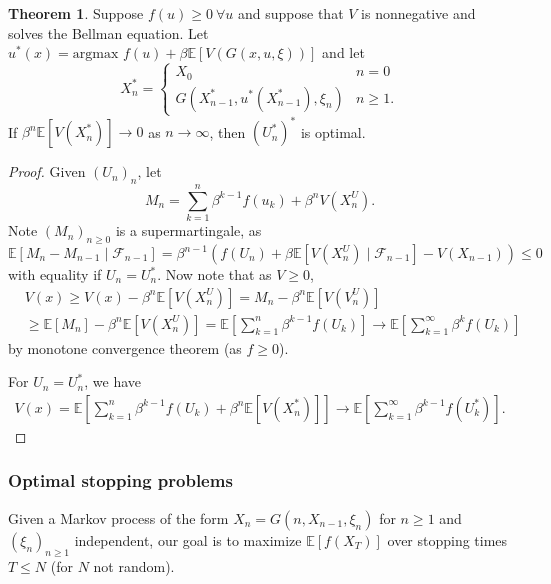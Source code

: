 \documentclass{article}
\theoremstyle{definition}
\newtheorem{theorem}{Theorem}[section]
\begin{document}
\begin{theorem}
    Suppose $f(u)\ge 0 ~\forall u$ and suppose that $V$ is nonnegative and solves the Bellman equation. Let $u^*(x) = \text{argmax }f(u) + \beta \mathbb{E}[V(G(x,u,\xi))]$ and let \[
    X_n^* = \begin{cases}
        X_0 &n=0\\
        G(X_{n-1}^*,u^*(X_{n-1}^*),\xi_n) &n\ge 1.
    \end{cases}
    \]
    If $\beta^n \mathbb{E}[V(X_n^*)] \to 0$ as $n \to \infty$, then $(U_n^*)^*$ is optimal.
\end{theorem}
\begin{proof}
    Given $(U_n)_n$, let \[
    M_n = \sum_{k=1}^{n} \beta^{k-1}f(u_k) + \beta^n V(X_n^U).
    \]
    Note $(M_n)_{n\ge 0}$ is a supermartingale, as \[
    \mathbb{E}[M_n-M_{n-1} \mid \mathcal{F}_{n-1}] = \beta^{n-1}\left(f(U_n)+\beta \mathbb{E}[V(X_n^U) \mid \mathcal{F}_{n-1}] - V(X_{n-1})\right)\le 0
    \] with equality if $U_n = U_n^*$. Now note that as $V\ge 0$,
    \begin{align*}
        &V(x)\ge V(x) - \beta^n \mathbb{E}[V(X_n^U)] = M_n - \beta^n \mathbb{E}[V(V_n^U)] \\
        &\ge \mathbb{E}[M_n] - \beta^n \mathbb{E}[V(X_n^U)] = \mathbb{E}[\sum_{k=1}^{n} \beta^{k-1}f(U_k)] \to \mathbb{E}[\sum_{k=1}^{\infty} \beta^k f(U_k)]
    \end{align*}
    by monotone convergence theorem (as $f\ge 0$).
    \vspace{1mm}
    
    For $U_n=U_n^*$, we have 
    \begin{align*}
        V(x)=\mathbb{E}[\sum_{k=1}^{n} \beta^{k-1}f(U_k)+\beta^n \mathbb{E}[V(X_n^*)]] \to \mathbb{E}[\sum_{k=1}^{\infty} \beta^{k-1}f(U_k^*)].
    \end{align*}
\end{proof}

\subsubsection*{Optimal stopping problems}


Given a Markov process of the form $X_n = G(n,X_{n-1},\xi_n)$ for $n\ge 1$ and $(\xi_n)_{n\ge 1}$ independent, our goal is to maximize $\mathbb{E}[f(X_T)]$ over stopping times $T\le N$ (for $N$ not random). 
\end{document}
